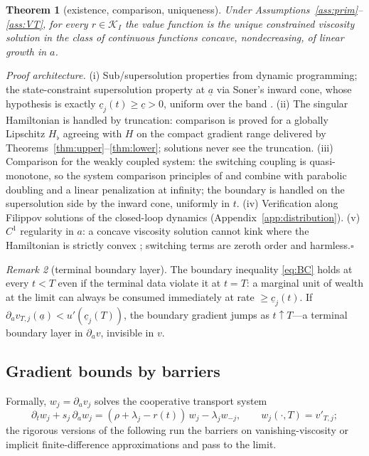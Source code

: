 \documentclass[11pt]{article}
\newtheorem{theorem}{Theorem}[section]
\theoremstyle{definition}
\theoremstyle{remark}
\newtheorem{remark}[theorem]{Remark}
\newcommand{\ubar}[1]{\underline{#1}}
\newcommand{\Kcal}{\mathcal{K}}
\newcommand{\ubc}{\ubar{c}}
\newcommand{\uba}{\ubar{a}}
\begin{document}
\begin{theorem}[existence, comparison, uniqueness]\label{thm:cvs}
Under Assumptions~\ref{ass:prim}--\ref{ass:VT}, for every
$r\in\Kcal_I$ the value function is the unique constrained viscosity
solution in the class of continuous functions concave, nondecreasing,
of linear growth in $a$.
\end{theorem}

\emph{Proof architecture.} (i) Sub/supersolution properties from
dynamic programming; the state-constraint supersolution property at
$\uba$ via Soner's inward cone, whose hypothesis is exactly
$\ubc_j(t)\ge\ubc>0$, uniform over the band
\citep{Soner1986a,Soner1986b,CDL1990}. (ii) The singular Hamiltonian
is handled by truncation: comparison is proved for a globally
Lipschitz $H_\flat$ agreeing with $H$ on the compact gradient range
delivered by Theorems~\ref{thm:upper}--\ref{thm:lower}; solutions
never see the truncation. (iii) Comparison for the weakly coupled
system: the switching coupling is quasi-monotone, so the system
comparison principles of \citet{IshiiKoike1991} and
\citet{EnglerLenhart1991} combine with parabolic doubling
\citep{CIL1992} and a linear penalization at infinity; the boundary is
handled on the supersolution side by the inward cone, uniformly in
$t$. (iv) Verification along Filippov solutions of the closed-loop
dynamics (Appendix~\ref{app:distribution}). (v) $C^1$ regularity in
$a$: a concave viscosity solution cannot kink where the Hamiltonian
is strictly convex \citep{CannarsaSinestrari2004}; switching terms are
zeroth order and harmless.\hfill$\square$

\begin{remark}[terminal boundary layer]\label{rem:BClayer}
The boundary inequality \eqref{eq:BC} holds at every $t<T$ even if
the terminal data violate it at $t=T$: a marginal unit of wealth at
the limit can always be consumed immediately at rate
$\ge\ubc_j(t)$. If $\partial_a v_{T,j}(\uba)<u'(\ubc_j(T))$, the
boundary gradient jumps as $t\uparrow T$---a terminal boundary layer
in $\partial_a v$, invisible in $v$.
\end{remark}

\subsection{Gradient bounds by barriers}

Formally, $w_j=\partial_a v_j$ solves the cooperative transport
system
\begin{equation}\label{eq:W}
\partial_t w_j+s_j\,\partial_a w_j
=(\rho+\lambda_j-r(t))\,w_j-\lambda_j w_{-j},\qquad
w_j(\cdot,T)=v'_{T,j};
\end{equation}
the rigorous versions of the following run the barriers on
vanishing-viscosity or implicit finite-difference approximations and
pass to the limit.
\end{document}
